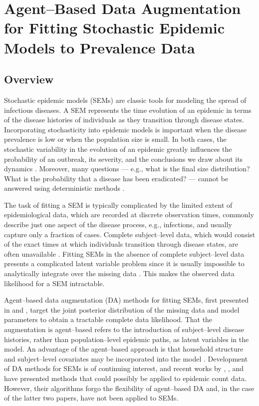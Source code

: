 \chapter{Agent--Based Data Augmentation for Fitting Stochastic Epidemic Models to Prevalence Data}
\label{chap:bda_for_fitting_sems_to_prevalence_data}

\section{Overview}
\label{sec:bda_overview}

Stochastic epidemic models (SEMs) are classic tools for modeling the spread of infectious diseases. A SEM represents the time evolution of an epidemic in terms of the disease histories of individuals as they transition through disease states. Incorporating stochasticity into epidemic models is important when the disease prevalence is low or when the population size is small. In both cases, the stochastic variability in the evolution of an epidemic greatly influences the probability of an outbreak, its severity, and the conclusions we draw about its dynamics \cite{allen2008introduction,keeling2008}. Moreover, many questions --- e.g., what is the final size distribution? What is the probability that a disease has been eradicated? --- cannot be answered using deterministic methods \cite{britton2010}.

The task of fitting a SEM is typically complicated by the limited extent of epidemiological data, which are recorded at discrete observation times, commonly describe just one aspect of the disease process, e.g., infections, and usually capture only a fraction of cases. Complete subject--level data, which would consist of the exact times at which individuals transition through disease states, are often unavailable \cite{oneill2010}. Fitting SEMs in the absence of complete subject--level data presents a complicated latent variable problem since it is usually impossible to analytically integrate over the missing data \cite{oneill2002}. This makes the observed data likelihood for a SEM intractable.

Agent--based data augmentation (DA) methods for fitting SEMs, first presented in \cite{gibson1998} and \cite{oneill1999}, target the joint posterior distribution of the missing data and model parameters to obtain a tractable complete data likelihood. That the augmentation is agent--based refers to the introduction of subject--level disease histories, rather than population--level epidemic paths, as latent variables in the model. An advantage of the agent--based approach is that household structure and subject--level covariates may be incorporated into the model \cite{auranen2000,hohle2002,cauchemez2004bayesian, neal2004statistical,oneill2009}. Development of DA methods for SEMs is of continuing interest, and recent works by \cite{pooley2015}, \cite{QinShe15}, and \cite{shestopaloff2016sampling} have presented methods that could possibly be applied to epidemic count data. However, their algorithms forgo the flexibility of agent--based DA and, in the case of the latter two papers, have not been applied to SEMs.

